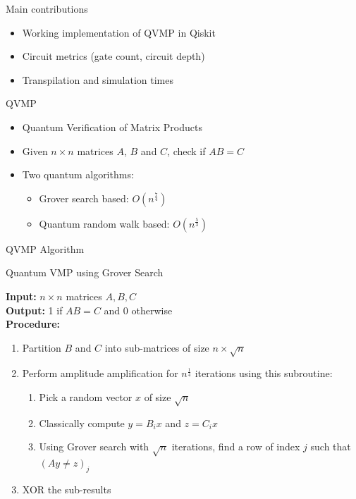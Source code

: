 \documentclass[10pt]{beamer}
\begin{document}
\begin{frame}{Main contributions}
  \begin{itemize}
    \item Working implementation of QVMP in Qiskit
    \item Circuit metrics (gate count, circuit depth)
    \item Transpilation and simulation times
  \end{itemize}
\end{frame}


\begin{frame}{QVMP}
  \begin{itemize}
    \item Quantum Verification of Matrix Products
    \item Given $n \times n$ matrices $A$, $B$ and $C$, check if $AB = C$
    \item {
        Two quantum algorithms:
        \begin{itemize}
          \item Grover search based: $O(n^{\frac{7}{4}})$
          \item Quantum random walk based: $O(n^{\frac{5}{3}})$
        \end{itemize}
    }
  \end{itemize}
\end{frame}


\begin{frame}{QVMP Algorithm}
\begin{algorithm}[H]
  \caption{Quantum VMP using Grover Search}
  \label{alg:qvmp_grover}
  \textbf{Input: } $n \times n$ matrices $A, B, C$ \\
  \textbf{Output: } 1 if $AB = C$ and 0 otherwise \\
  \textbf{Procedure: }
  \begin{enumerate}
    \item Partition $B$ and $C$ into sub-matrices of size $n \times \sqrt{n}$
    \item 
      {
        Perform amplitude amplification for $n^{\frac{1}{4}}$ iterations using this subroutine:
        \begin{enumerate}
          \item Pick a random vector $x$ of size $\sqrt{n}$
          \item Classically compute $y = B_ix$ and $z = C_ix$
          \item Using Grover search with $\sqrt{n}$ iterations, find a row of
            index $j$ such that $(Ay \neq z)_j$
        \end{enumerate}
      }
    \item XOR the sub-results
  \end{enumerate}
\end{algorithm}
\end{frame}
\end{document}
